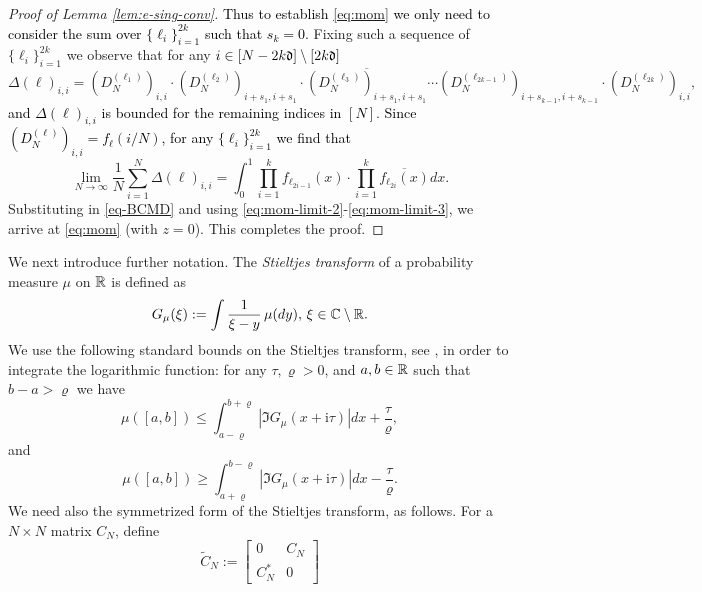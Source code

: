\documentclass{amsart}
\numberwithin{equation}{section}
\def\corAB{}
\def\corOZ{}
\def\corABrev{\textcolor{black}}
\begin{document}
\begin{proof}[Proof of Lemma \ref{lem:e-sing-conv}]
\corABrev{Thus to establish \eqref{eq:mom} we only need to consider the sum over $\{\ell_i\}_{i=1}^{2k}$ such that $s_k =0$.} Fixing such a sequence of $\{\ell_i\}_{i=1}^{2k}$ we observe that \corAB{for any $i \in [N-2k\mathfrak{d}] \setminus [2k\mathfrak{d}]$}
\begin{equation}\label{eq:mom-limit-4}
\Delta ({\bm \ell})_{i,i} = (D_N^{(\ell_1)})_{i,i} \cdot (D_N^{(\ell_2)})_{i+s_1,i+s_1} \cdot \overline{(D_N^{(\ell_3)})_{i+s_1,i+s_1}} \cdots (D_N^{(\ell_{2k-1})})_{i+s_{k-1},i+s_{k-1}} \cdot (D_N^{(\ell_{2k})})_{i,i},
\end{equation}
\corABrev{and $\Delta({\bm \ell})_{i,i}$ is bounded for the remaining indices in $[N]$}. \corABrev{Since $(D_N^{(\ell)})_{i,i}=f_\ell(i/N)$, for any $\{\ell_i\}_{i=1}^{2k}$ we find that}
\[
\lim_{N \to \infty} \corAB{\frac{1}{N}}\sum_{i=1}^N\Delta({\bm \ell})_{i,i} = \int_0^1 \prod_{i=1}^k f_{\ell_{2i-1}}(x) \cdot \prod_{i=1}^k \overline{f_{\ell_{2i}}(x)} dx.
\]
\corOZ{Substituting} in \eqref{eq-BCMD} and
using \eqref{eq:mom-limit-2}-\eqref{eq:mom-limit-3},
we arrive at \eqref{eq:mom} (with $z=0$). This completes the proof.
\end{proof}
We next introduce further notation. The \textit{Stieltjes transform} of
a probability measure $\mu$ on $\mathbb{R}$
 is defined as
\[
G_\mu(\xi):=\int \frac{1}{\xi-y}\, \mu(dy), \, \xi \in \mathbb{C}\setminus \mathbb{R}.
\]
We use the following standard bounds on the Stieltjes transform, see
\cite[(6)-(8)]{GWZ}, in order to integrate the logarithmic function:
for any $\tau, \varrho >0$, and $a, b \in \mathbb{R}$ such that
$b - a > \varrho$ we have
\begin{equation}\label{eq:pr-stielt-ubd}
\mu([a,b]) \le \int_{a-\varrho}^{b+\varrho} |\Im G_\mu(x + \mathrm{i} \tau)| dx + \frac{\tau}{\varrho},
\end{equation}
and
\begin{equation}\label{eq:pr-stielt-lbd}
\mu([a,b]) \ge \int_{a+\varrho}^{b-\varrho} |\Im G_\mu(x + \mathrm{i} \tau)| dx  - \frac{\tau}{\varrho}.
\end{equation}
We need also the symmetrized form of the Stieltjes transform, as follows.
For a $N \times N$ matrix $C_N$, define
\[
\widetilde{C}_N:= \begin{bmatrix} 0 & C_N \\ C_N^* & 0 \end{bmatrix}
\]
\end{document}

